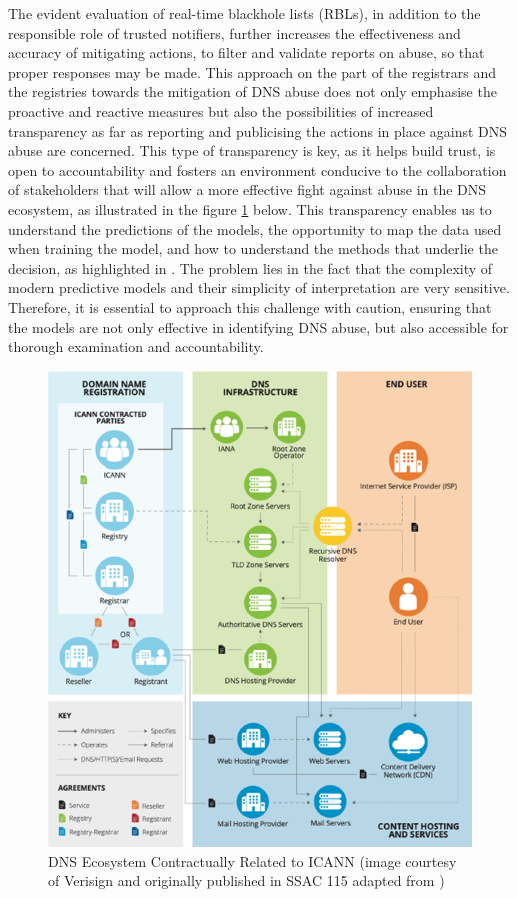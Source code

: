 The evident evaluation of real-time blackhole lists (RBLs), in addition to the responsible role of trusted notifiers, further increases the effectiveness and accuracy of mitigating actions, to filter and validate reports on abuse, so that proper responses may be made. This approach on the part of the registrars and the registries towards the mitigation of DNS abuse does not only emphasise the proactive and reactive measures but also the possibilities of increased transparency as far as reporting and publicising the actions in place against DNS abuse are concerned. This type of transparency is key, as it helps build trust, is open to accountability and fosters an environment conducive to the collaboration of stakeholders that will allow a more effective fight against abuse in the DNS ecosystem, as illustrated in the figure \ref{fig:fig14} below. This transparency enables us to understand the predictions of the models, the opportunity to map the data used when training the model, and how to understand the methods that underlie the decision, as highlighted in \cite{hussain2022software}. The problem lies in the fact that the complexity of modern predictive models and their simplicity of interpretation are very sensitive. Therefore, it is essential to approach this challenge with caution, ensuring that the models are not only effective in identifying DNS abuse, but also accessible for thorough examination and accountability. 

\captionsetup{font= footnotesize}
\begin{figure}[H]
\centering
    \includegraphics[width=0.6\linewidth]{background/DNSECO.png}
    \caption{DNS Ecosystem Contractually Related to ICANN (image
courtesy of Verisign and originally published in SSAC 115 adapted from \cite{SSAC2023SAC115})}
    \label{fig:fig14}
\end{figure}



